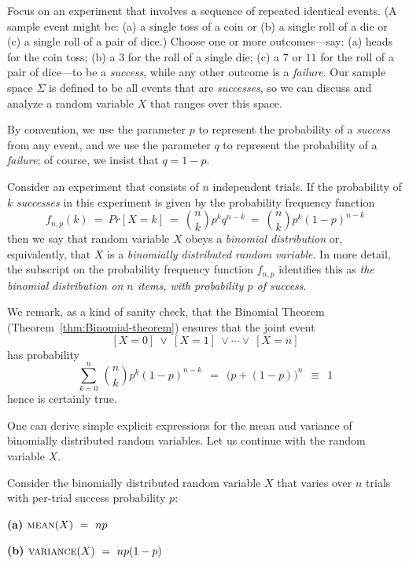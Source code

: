 Focus on an experiment that involves a sequence of repeated identical events.  (A sample event might be: (a) a single toss of a coin or (b) a single roll of a die or (c) a single roll of a pair of dice.)  Choose one or more outcomes---say: (a) {\sc heads} for the coin toss; (b) a $3$ for the roll of a single die; (c) a $7$ or $11$ for the roll of a pair of dice---to be a {\em success}, while any other outcome is a {\em failure}.  Our sample space $\Sigma$ is defined to be all events that are {\em successes}, so we can discuss and analyze a random variable $X$ that ranges over this space.

By convention, we use the parameter $p$ to represent the probability of a {\em success} from any event, and we use the parameter $q$ to represent the probability of a {\em failure}; of course, we insist that $q = 1-p$.

  
Consider an experiment that consists of $n$ independent trials.  If the probability of $k$ {\em successes} in this experiment is given by the probability frequency function
\begin{equation}
\label{eq:binomial-prob-freq}
f_{n,p}(k) \ = \ Pr[X=k] \ = \ {n \choose k} p^k q^{n-k} \ = \ {n \choose k} p^k (1-p)^{n-k}
\end{equation}
then we say that random variable $X$ obeys a {\em binomial distribution} or, equivalently, that $X$ is a {\em binomially distributed random variable}.  In more detail, the subscript on the probability frequency function $f_{n,p}$ identifies this as {\em the binomial distribution on $n$ items, with probability $p$ of success}.

We remark, as a kind of sanity check, that the Binomial Theorem (Theorem~\ref{thm:Binomial-theorem}) ensures that the joint event
\[ [X=0] \ \vee \ [X=1] \ \vee \cdots  \vee \ [X=n] \]
has probability
\[ \sum_{k=0}^n \ {n \choose k} p^k (1-p)^{n-k} \ \ = \ \  \big(p + (1-p) \big)^n \ \ \equiv \ \ 1 \] 
hence is certainly {\sc true}.

\bigskip

One can derive simple explicit expressions for the mean and variance of binomially distributed random variables.  Let us continue with the random variable $X$.

\begin{prop}
\label{thm:bin-vble-mean+variance}
Consider the binomially distributed random variable $X$ that varies over $n$ trials with per-trial success probability $p$:

{\bf (a)} $\mbox{\sc mean}(X) \ = \ np$

{\bf (b)} $\mbox{\sc variance}(X) \ = \ np(1-p)$
\end{prop}

